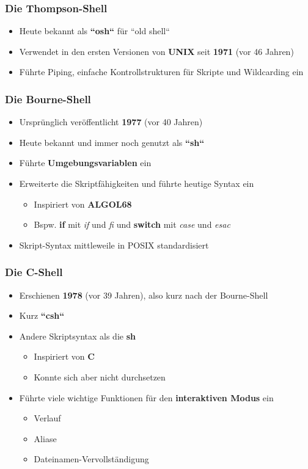 \begin{frame}
    \frametitle{Die Thompson-Shell}
    \begin{itemize}
        \item Heute bekannt als \textbf{``osh``} für ``old shell``
        \item Verwendet in den ersten Versionen von \textbf{UNIX} seit \textbf{1971} (vor 46 Jahren)
        \item Führte Piping, einfache Kontrollstrukturen für Skripte und Wildcarding ein
    \end{itemize}
\end{frame}

\begin{frame}
    \frametitle{Die Bourne-Shell}
    \begin{itemize}
        \item Ursprünglich veröffentlicht \textbf{1977} (vor 40 Jahren)
        \item Heute bekannt und immer noch genutzt als \textbf{``sh``}
        \item Führte \textbf{Umgebungsvariablen} ein
        \item Erweiterte die Skriptfähigkeiten und führte heutige Syntax ein
        \begin{itemize}
            \item Inspiriert von \textbf{ALGOL68}
            \item Bspw. \textbf{if} mit \textit{if} und \textit{fi} und \textbf{switch} mit \textit{case} und \textit{esac}
        \end{itemize}
        \item Skript-Syntax mittleweile in POSIX standardisiert
    \end{itemize}
\end{frame}

\begin{frame}
    \frametitle{Die C-Shell}
    \begin{itemize}
        \item Erschienen \textbf{1978} (vor 39 Jahren), also kurz nach der Bourne-Shell
        \item Kurz \textbf{``csh``}
        \item Andere Skriptsyntax als die \textbf{sh}
        \begin{itemize}
            \item Inspiriert von \textbf{C}
            \item Konnte sich aber nicht durchsetzen
        \end{itemize}
        \item Führte viele wichtige Funktionen für den \textbf{interaktiven Modus} ein
        \begin{itemize}
            \item Verlauf
            \item Aliase
            \item Dateinamen-Vervollständigung
        \end{itemize}
    \end{itemize}
\end{frame}

